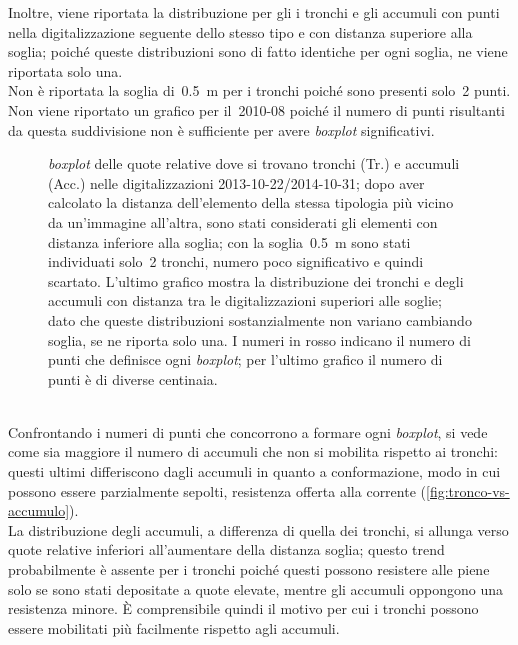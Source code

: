 Inoltre, viene riportata la distribuzione per gli i tronchi e gli accumuli con punti nella digitalizzazione seguente dello stesso tipo e con distanza superiore alla soglia; poiché queste distribuzioni sono di fatto identiche per ogni soglia, ne viene riportata solo una.
\\
Non è riportata la soglia di~\SI{0.5}{\m} per i tronchi poiché sono presenti solo~2 punti.
Non viene riportato un grafico per il~2010-08 poiché il numero di punti risultanti da questa suddivisione non è sufficiente per avere \emph{boxplot} significativi.
%
\begin{figure}
	\centering
	
	\caption[\emph{boxplot} delle quote relative distinte per tronchi e accumuli legnosi]{\emph{boxplot} delle quote relative dove si trovano tronchi (Tr.) e accumuli (Acc.) nelle digitalizzazioni 2013-10-22/2014-10-31; dopo aver calcolato la distanza dell'elemento della stessa tipologia più vicino da un'immagine all'altra, sono stati considerati gli elementi con distanza inferiore alla soglia; con la soglia~\SI{0.5}{\m} sono stati individuati solo~\num{2} tronchi, numero poco significativo e quindi scartato.
	L'ultimo grafico mostra la distribuzione dei tronchi e degli accumuli con distanza tra le digitalizzazioni superiori alle soglie; dato che queste distribuzioni sostanzialmente non variano cambiando soglia, se ne riporta solo una.
	I numeri in rosso indicano il numero di punti che definisce ogni \emph{boxplot}; per l'ultimo grafico il numero di punti è di diverse centinaia.}
	\label{graph:legno-wj-dem-detrended-distanza}
\end{figure}
%
\\
Confrontando i numeri di punti che concorrono a formare ogni \emph{boxplot}, si vede come sia maggiore il numero di accumuli che non si mobilita rispetto ai tronchi: questi ultimi differiscono dagli accumuli in quanto a conformazione, modo in cui possono essere parzialmente sepolti, resistenza offerta alla corrente (\cref{fig:tronco-vs-accumulo}).
%
%
\\
La distribuzione degli accumuli, a differenza di quella dei tronchi, si allunga verso quote relative inferiori all'aumentare della distanza soglia; questo trend probabilmente è assente per i tronchi poiché questi possono resistere alle piene solo se sono stati depositate a quote elevate, mentre gli accumuli oppongono una resistenza minore.
È comprensibile quindi il motivo per cui i tronchi possono essere mobilitati più facilmente rispetto agli accumuli.
